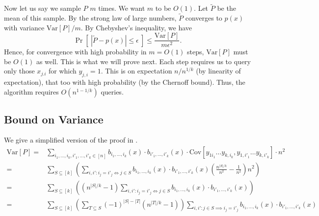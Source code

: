 \documentclass[12pt]{report}
\newcommand{\Var}{\mathrm{Var}}
\newcommand{\Cov}{\mathrm{Cov}}
\begin{document}
Now let us say we sample $P$ $m$ times. We want $m$ to be $O(1)$. Let $\tilde{P}$ be the mean of this sample. By the strong law of large numbers, $\tilde{P}$ converges to $p(x)$ with variance $\Var[P]/m$. By Chebyshev's inequality, we have
\begin{equation}
\Pr[~|\tilde{P} - p(x)| \leq \epsilon~] \leq \frac{\Var[P]}{m \epsilon^2}.
\end{equation}
Hence, for convergence with high probability in $m = O(1)$ steps, $\Var[P]$ must be $O(1)$ as well. This is what we will prove next. Each step requires us to query only those $x_{j.i}$ for which $y_{j,i} = 1$. This is on expectation $n/n^{1/k}$ (by linearity of expectation), that too with high probability (by the Chernoff bound). Thus, the algorithm requires $O(n^{1-1/k})$ queries.

\subsection{Bound on Variance}
We give a simplified version of the proof in \cite{paper1}.
\begin{equation*}
\begin{split}
\Var[P] = & \sum_{i_1, \ldots, i_k, i'_1, \ldots, i'_k \in [n]} b_{i_1, \ldots, i_k}(x) \cdot b_{i'_1, \ldots, i'_k}(x) \cdot \Cov[y_{1 i_1} \ldots y_{k,i_k}, y_{1,i'_1} \ldots y_{k,i'_k}] \cdot n^2
\\
= & \sum_{S \subseteq [k]} \left(\sum_{i,i'\colon i_j = i'_j \iff j \in S} b_{i_1, \ldots, i_k}(x) \cdot b_{i'_1, \ldots, i'_k}(x) \left(\frac{n^{|S|/k}}{n^2} - \frac{1}{n^2}\right) n^2\right)
\\
= & \sum_{S \subseteq [k]} \left((n^{|S|/k} - 1) \sum_{i,i'\colon i_j = i'_j \iff j \in S} b_{i_1, \ldots, i_k}(x) \cdot b_{i'_1, \ldots, i'_k}(x)\right)
\\
= & \sum_{S \subseteq [k]} \left(\sum_{T \subseteq S} (-1)^{|S| - |T|} (n^{|T|/k} - 1)\right) \sum_{i,i'\colon j \in S\implies i_j = i'_j} b_{i_1, \ldots, i_k}(x) \cdot b_{i'_1, \ldots, i'_k}(x)
\end{split}
\end{equation*}
\end{document}
